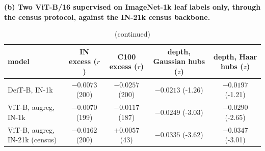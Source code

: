 \begin{table}[tbp]\ContinuedFloat
\centering
\scriptsize
\setlength{\tabcolsep}{2.2pt}
\begingroup
\noindent\textbf{(b) Two ViT-B/16 supervised on ImageNet-1k leaf labels only, through the census protocol, against the IN-21k census backbone.}\par\vspace{1.5pt}
\setlength{\tabcolsep}{4pt}
\begin{tabular}{lcccc}
\toprule
model & IN excess ($r$) & C100 excess ($r$) & depth, Gaussian hubs ($z$) & depth, Haar hubs ($z$) \\
\midrule
DeiT-B, IN-1k & $-0.0073$ (200) & $-0.0257$ (200) & $-0.0213$ (-1.26) & $-0.0197$ (-1.21) \\
ViT-B, augreg, IN-1k & $-0.0070$ (199) & $-0.0117$ (187) & $-0.0249$ (-3.03) & $-0.0290$ (-2.65) \\
ViT-B, augreg, IN-21k (census) & $-0.0162$ (200) & $+0.0057$ (43) & $-0.0335$ (-3.62) & $-0.0347$ (-3.01) \\
\bottomrule
\end{tabular}
\par\vspace{5pt}
\endgroup
\caption{(continued)}
\end{table}
